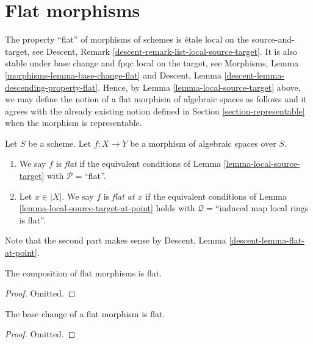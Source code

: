 \section{Flat morphisms}
\label{section-flat}

\noindent
The property ``flat'' of morphisms of schemes is
\'etale local on the source-and-target, see
Descent, Remark \ref{descent-remark-list-local-source-target}.
It is also stable under base change and fpqc local on the target, see
Morphisms, Lemma \ref{morphisms-lemma-base-change-flat} and
Descent, Lemma \ref{descent-lemma-descending-property-flat}.
Hence, by
Lemma \ref{lemma-local-source-target}
above, we may define the notion of a flat morphism of algebraic spaces as
follows and it agrees with the already existing notion defined in
Section \ref{section-representable}
when the morphism is representable.

\begin{definition}
\label{definition-flat}
Let $S$ be a scheme.
Let $f : X \to Y$ be a morphism of algebraic spaces over $S$.
\begin{enumerate}
\item We say $f$ is {\it flat} if the equivalent conditions of
Lemma \ref{lemma-local-source-target} with
$\mathcal{P} =$``flat''.
\item Let $x \in |X|$. We say $f$ is {\it flat at $x$} if the
equivalent conditions of
Lemma \ref{lemma-local-source-target-at-point}
holds with $\mathcal{Q} =$``induced map local rings is flat''.
\end{enumerate}
Note that the second part makes sense by
Descent, Lemma \ref{descent-lemma-flat-at-point}.
\end{definition}


\begin{lemma}
\label{lemma-composition-flat}
The composition of flat morphisms is flat.
\end{lemma}

\begin{proof}
Omitted.
\end{proof}

\begin{lemma}
\label{lemma-base-change-flat}
The base change of a flat morphism is flat.
\end{lemma}

\begin{proof}
Omitted.
\end{proof}

